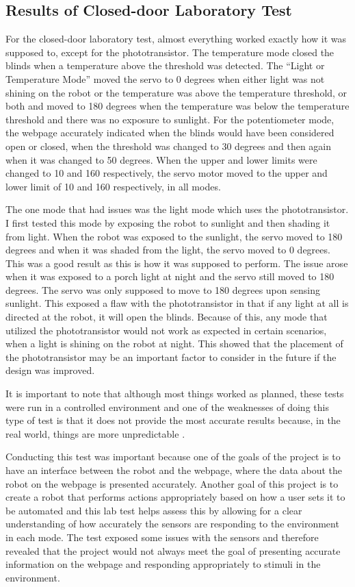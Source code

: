\documentclass[10pt,twocolumn]{article}
\begin{document}
\subsection{Results of Closed-door Laboratory Test}
For the closed-door laboratory test, almost everything worked exactly how it was supposed to, except for the phototransistor. The temperature mode closed the blinds when a temperature above the threshold was detected. The “Light or Temperature Mode” moved the servo to 0 degrees when either light was not shining on the robot or the temperature was above the temperature threshold, or both and moved to 180 degrees when the temperature was below the temperature threshold and there was no exposure to sunlight. For the potentiometer mode, the webpage accurately indicated when the blinds would have been considered open or closed, when the threshold was changed to 30 degrees and then again when it was changed to 50 degrees. When the upper and lower limits were changed to 10 and 160 respectively, the servo motor moved to the upper and lower limit of 10 and 160 respectively, in all modes.

The one mode that had issues was the light mode which uses the phototransistor. I first tested this mode by exposing the robot to sunlight and then shading it from light. When the robot was exposed to the sunlight, the servo moved to 180 degrees and when it was shaded from the light, the servo moved to 0 degrees. This was a good result as this is how it was supposed to perform. The issue arose when it was exposed to a porch light at night and the servo still moved to 180 degrees. The servo was only supposed to move to 180 degrees upon sensing sunlight. This exposed a flaw with the phototransistor in that if any light at all is directed at the robot, it will open the blinds. Because of this, any mode that utilized the phototransistor would not work as expected in certain scenarios, when a light is shining on the robot at night. This showed that the placement of the phototransistor may be an important factor to consider in the future if the design was improved. 

It is important to note that although most things worked as planned, these tests were run in a controlled environment and one of the weaknesses of doing this type of test is that it does not provide the most accurate results because, in the real world, things are more unpredictable \cite{Muller2015Designing}.

Conducting this test was important because one of the goals of the project is to have an interface between the robot and the webpage, where the data about the robot on the webpage is presented accurately. Another goal of this project is to create a robot that performs actions appropriately based on how a user sets it to be automated and this lab test helps assess this by allowing for a clear understanding of how accurately the sensors are responding to the environment in each mode. The test exposed some issues with the sensors and therefore revealed that the project would not always meet the goal of presenting accurate information on the webpage and responding appropriately to stimuli in the environment. 
\end{document}

